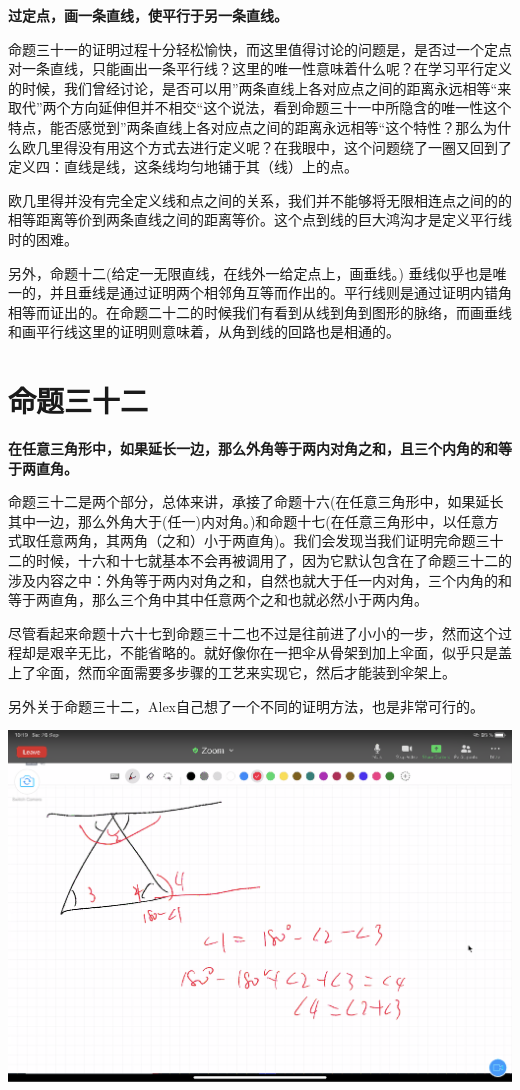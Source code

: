 \documentclass[
]{book}
\begin{document}
\textbf{过定点，画一条直线，使平行于另一条直线。}

命题三十一的证明过程十分轻松愉快，而这里值得讨论的问题是，是否过一个定点对一条直线，只能画出一条平行线？这里的唯一性意味着什么呢？在学习平行定义的时候，我们曾经讨论，是否可以用''两条直线上各对应点之间的距离永远相等``来取代''两个方向延伸但并不相交``这个说法，看到命题三十一中所隐含的唯一性这个特点，能否感觉到''两条直线上各对应点之间的距离永远相等``这个特性？那么为什么欧几里得没有用这个方式去进行定义呢？在我眼中，这个问题绕了一圈又回到了定义四：直线是线，这条线均匀地铺于其（线）上的点。

欧几里得并没有完全定义线和点之间的关系，我们并不能够将无限相连点之间的的相等距离等价到两条直线之间的距离等价。这个点到线的巨大鸿沟才是定义平行线时的困难。

另外，命题十二(给定一无限直线，在线外一给定点上，画垂线。) 垂线似乎也是唯一的，并且垂线是通过证明两个相邻角互等而作出的。平行线则是通过证明内错角相等而证出的。在命题二十二的时候我们有看到从线到角到图形的脉络，而画垂线和画平行线这里的证明则意味着，从角到线的回路也是相通的。

\hypertarget{ux547dux9898ux4e09ux5341ux4e8c}{%
\section{命题三十二}\label{ux547dux9898ux4e09ux5341ux4e8c}}

\textbf{在任意三角形中，如果延长一边，那么外角等于两内对角之和，且三个内角的和等于两直角。}

命题三十二是两个部分，总体来讲，承接了命题十六(在任意三角形中，如果延长其中一边，那么外角大于(任一)内对角。)和命题十七(在任意三角形中，以任意方式取任意两角，其两角（之和）小于两直角)。我们会发现当我们证明完命题三十二的时候，十六和十七就基本不会再被调用了，因为它默认包含在了命题三十二的涉及内容之中：外角等于两内对角之和，自然也就大于任一内对角，三个内角的和等于两直角，那么三个角中其中任意两个之和也就必然小于两内角。

尽管看起来命题十六十七到命题三十二也不过是往前进了小小的一步，然而这个过程却是艰辛无比，不能省略的。就好像你在一把伞从骨架到加上伞面，似乎只是盖上了伞面，然而伞面需要多步骤的工艺来实现它，然后才能装到伞架上。

另外关于命题三十二，Alex自己想了一个不同的证明方法，也是非常可行的。

\includegraphics[width=1\linewidth]{./image/14-prop32-image14}
\end{document}
